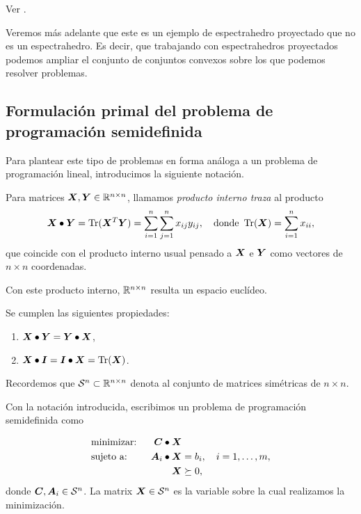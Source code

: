 \begin{example}
Ver \cite[Ejemplo 2.9]{Blekherman2013}.
\end{example}

Veremos más adelante que este es un ejemplo de espectrahedro proyectado que no es un espectrahedro. Es decir, que trabajando con espectrahedros proyectados podemos ampliar el conjunto de conjuntos convexos sobre los que podemos resolver problemas.




\subsection{Formulación primal del problema de programación semidefinida}

Para plantear este tipo de problemas en forma análoga a un problema de programación lineal, introducimos la siguiente notación.

Para matrices $\bm{X}, \bm{Y} \in \mathbb{R}^{n \times n}$, llamamos \emph{producto interno traza} al producto
$$
\bm{X} \bullet \bm{Y} = \operatorname{Tr}(\bm{X}^T \bm{Y}) = \sum_{i=1}^n\sum_{j=1}^n x_{ij} y_{ij}, \quad \text{donde } \operatorname{Tr}(\bm{X}) = \sum_{i=1}^n x_{ii},
$$
que coincide con el producto interno usual pensado a $\bm{X}$ e $\bm{Y}$ como vectores de $n \times n$ coordenadas.

Con este producto interno, $\mathbb{R}^{n \times n}$ resulta un espacio euclídeo.

Se cumplen las siguientes propiedades:
\begin{enumerate}
\item $\bm{X} \bullet \bm{Y} = \bm{Y} \bullet \bm{X}$,
\item $\bm{X} \bullet \bm{I} = \bm{I} \bullet \bm{X} = \operatorname{Tr}(\bm{X})$.
\end{enumerate}

Recordemos que ${\mathcal S}^n \subset \mathbb{R}^{n \times n}$ denota al conjunto de matrices simétricas de $n \times n$.

Con la notación introducida, escribimos un problema de programación semidefinida como

\begin{alignat*}{2}
  & \text{minimizar: } & \bm{C} \bullet \bm{X} & \\
  & \text{sujeto a: }  \quad & \bm{A}_i \bullet \bm{X} &= b_i, \quad i = 1, \dots, m, \\
   && \bm{X} &\succeq 0,
\end{alignat*}
donde $\bm{C}, \bm{A}_i \in {\mathcal S}^n$. La matrix $\bm{X} \in {\mathcal S}^n$ es la variable sobre la cual realizamos la minimización.

